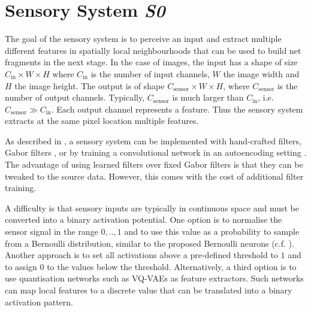 \section{Sensory System \emph{S0}}
The goal of the sensory system is to perceive an input and extract multiple different features in spatially local neighbourhoods that can be used to build net fragments in the next stage.
In the case of images, the input has a shape of size $C_{\text{in}} \times W \times H$ where $C_{\text{in}}$ is the number of input channels, $W$ the image width and $H$ the image height.
The output is of shape $C_{\text{sensor}} \times W \times H$, where $C_{\text{sensor}}$ is the number of output channels. Typically, $C_{\text{sensor}}$ is much larger than $C_{\text{in}}$, i.e. $C_{\text{sensor}} \gg C_{\text{in}}$.
Each output channel represents a feature. Thus the sensory system extracts at the same pixel location multiple features.

As described in , a sensory system can be implemented with hand-crafted filters, Gabor filters , or by training a convolutional network in an autoencoding setting . The advantage of using learned filters over fixed Gabor filters is that they can be tweaked to the source data. However, this comes with the cost of additional filter training.

A difficulty is that sensory inputs are typically in continuous space and must be converted into a binary activation potential.
One option is to normalise the sensor signal in the range $0, .., 1$ and to use this value as a probability to sample from a Bernoulli distribution, similar to the proposed Bernoulli neurons (c.f. ).
Another approach is to set all activations above a pre-defined threshold to $1$ and to assign 0 to the values below the threshold.
Alternatively, a third option is to use quantisation networks such as VQ-VAEs  as feature extractors. Such networks can map local features to a discrete value that can be translated into a binary activation pattern.


